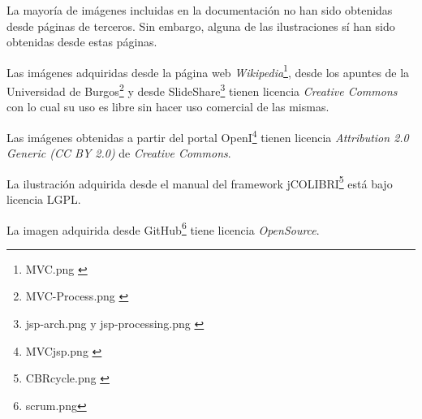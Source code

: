 La mayoría de imágenes incluidas en la documentación no han sido obtenidas desde páginas de terceros. Sin embargo, alguna de las ilustraciones sí han sido obtenidas desde estas páginas.

Las imágenes adquiridas desde la página web \emph{Wikipedia}\footnote{MVC.png \cite{img:mvc}}, desde los apuntes de la Universidad de Burgos\footnote{MVC-Process.png \cite{mvc:info}} y desde SlideShare\footnote{jsp-arch.png \cite{img:jsp2} y jsp-processing.png \cite{img:jsp1}} tienen licencia \emph{Creative Commons} con lo cual su uso es libre sin hacer uso comercial de las mismas.

Las imágenes obtenidas a partir del portal OpenI\footnote{MVCjsp.png \cite{img:repo}} tienen licencia \emph{Attribution 2.0 Generic (CC BY 2.0)} de \emph{Creative Commons}.

La ilustración adquirida desde el manual del framework jCOLIBRI\footnote{CBRcycle.png \cite{img:cbr}} está bajo licencia LGPL.

La imagen adquirida desde GitHub\footnote{scrum.png\cite{img:scrum}} tiene licencia \emph{OpenSource}.

